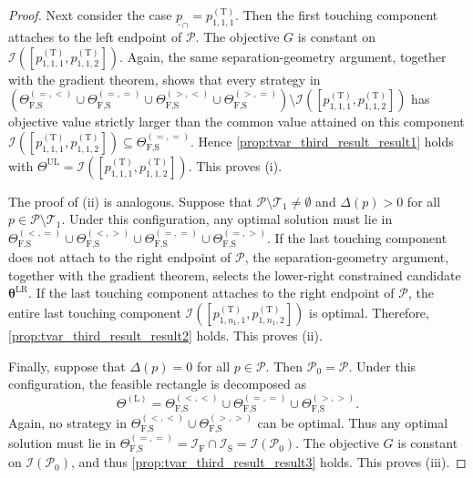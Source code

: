 \documentclass[a4paper,12pt]{article}
\begin{document}
\begin{proof}
Next consider the case $\underline{p}_{\cap}=p^{\left(\text{T}\right)}_{1,1,1}$. Then the first touching component attaches to the left endpoint of $\mathcal{P}$. The objective $G$ is constant on $\mathcal{I}\left(\left[p^{\left(\text{T}\right)}_{1,1,1},p^{\left(\text{T}\right)}_{1,1,2}\right]\right)$. Again, the same separation-geometry argument, together with the gradient theorem, shows that every strategy in $\left(\Theta_{\text{F,S}}^{\left(=,<\right)}\cup\Theta_{\text{F,S}}^{\left(=,=\right)}\cup\Theta_{\text{F,S}}^{\left(>,<\right)}\cup\Theta_{\text{F,S}}^{\left(>,=\right)}\right)\setminus\mathcal{I}\left(\left[p^{\left(\text{T}\right)}_{1,1,1},p^{\left(\text{T}\right)}_{1,1,2}\right]\right)$ has objective value strictly larger than the common value attained on this component $\mathcal{I}\left(\left[p^{\left(\text{T}\right)}_{1,1,1},p^{\left(\text{T}\right)}_{1,1,2}\right]\right)\subseteq\Theta_{\text{F,S}}^{\left(=,=\right)}$. Hence \eqref{prop:tvar_third_result_result1} holds with $\Theta^{\text{UL}}=\mathcal{I}\left(\left[p^{\left(\text{T}\right)}_{1,1,1},p^{\left(\text{T}\right)}_{1,1,2}\right]\right)$.
This proves (i).

The proof of (ii) is analogous. Suppose that $\mathcal{P}\setminus\mathcal{T}_1\neq\emptyset$ and $\Delta\left(p\right)>0$ for all $p\in\mathcal{P}\setminus\mathcal{T}_1$. Under this configuration, any optimal solution must lie in $\Theta_{\text{F,S}}^{\left(<,=\right)}\cup\Theta_{\text{F,S}}^{\left(<,>\right)}\cup\Theta_{\text{F,S}}^{\left(=,=\right)}\cup\Theta_{\text{F,S}}^{\left(=,>\right)}$. If the last touching component does not attach to the right endpoint of $\mathcal{P}$, the separation-geometry argument, together with the gradient theorem, selects the lower-right constrained candidate ${\bm\theta}^{\text{LR}}$. If the last touching component attaches to the right endpoint of $\mathcal{P}$, the entire last touching component $\mathcal{I}\left(\left[p^{\left(\text{T}\right)}_{1,n_1,1},p^{\left(\text{T}\right)}_{1,n_1,2}\right]\right)$ is optimal. Therefore, \eqref{prop:tvar_third_result_result2} holds. This proves (ii).

Finally, suppose that $\Delta\left(p\right)=0$ for all $p\in\mathcal{P}$. Then $\mathcal{P}_0=\mathcal{P}$. Under this configuration, the feasible rectangle is decomposed as
\begin{equation*}
\Theta^{\left(\text{L}\right)}=\Theta_{\text{F,S}}^{\left(<,<\right)}\cup\Theta_{\text{F,S}}^{\left(=,=\right)}\cup\Theta_{\text{F,S}}^{\left(>,>\right)}.
\end{equation*}
Again, no strategy in $\Theta_{\text{F,S}}^{\left(<,<\right)}\cup\Theta_{\text{F,S}}^{\left(>,>\right)}$ can be optimal. Thus any optimal solution must lie in $\Theta_{\text{F,S}}^{\left(=,=\right)}=\mathcal{I}_{\text{F}}\cap\mathcal{I}_{\text{S}}=\mathcal{I}\left(\mathcal{P}_0\right)$. The objective $G$ is constant on $\mathcal{I}\left(\mathcal{P}_0\right)$, and thus \eqref{prop:tvar_third_result_result3} holds. This proves (iii).
\end{proof}
\end{document}
